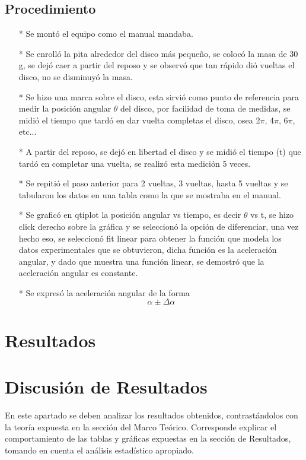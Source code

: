 \documentclass[osajnl,twocolumn,showpacs,superscriptaddress,10pt]{revtex4-1}
\begin{document}
\subsection{Procedimiento}
\begin{enumerate}
\item[*] Se montó el equipo como el manual mandaba.
\item[*] Se enrolló la pita alrededor del disco más pequeño, se colocó la masa de 30 g, se dejó caer a partir del reposo y se observó que tan rápido dió vueltas el disco, no se disminuyó la masa.
\item[*] Se hizo una marca sobre el disco, esta sirvió como punto de referencia para medir la posición angular $\theta$ del disco, por facilidad de toma de medidas, se midió el tiempo que tardó en dar vuelta completas el disco, osea 2$\pi$, 4$\pi$, 6$\pi$, etc...
\item[*] A partir del reposo, se dejó en libertad el disco y se midió el tiempo (t)  que tardó en completar una vuelta, se realizó esta medición 5 veces.
\item[*] Se repitió el paso anterior para 2 vueltas, 3 vueltas, hasta 5 vueltas y se tabularon los datos en una tabla como la que se mostraba en el manual.
\item[*] Se graficó en qtiplot la posición angular vs tiempo, es decir $\theta$ vs t, se hizo click derecho sobre la gráfica y se seleccionó la opción de diferenciar, una vez hecho eso, se seleccionó fit linear para obtener la función que modela los datos experimentales que se obtuvieron, dicha función es la aceleración angular, y dado que muestra una función linear, se demostró que la aceleración angular es constante.
\item[*] Se expresó la aceleración angular de la forma $$\alpha \pm \Delta\alpha$$
\end{enumerate}

\section{Resultados}


\section{Discusión de Resultados}

En este apartado se deben analizar los resultados obtenidos, contrastándolos con
la teoría expuesta en la sección del Marco Teórico. Corresponde explicar el
comportamiento de las tablas y gráficas expuestas en la sección de Resultados,
tomando en cuenta el análisis estadístico apropiado.\\
\end{document}
